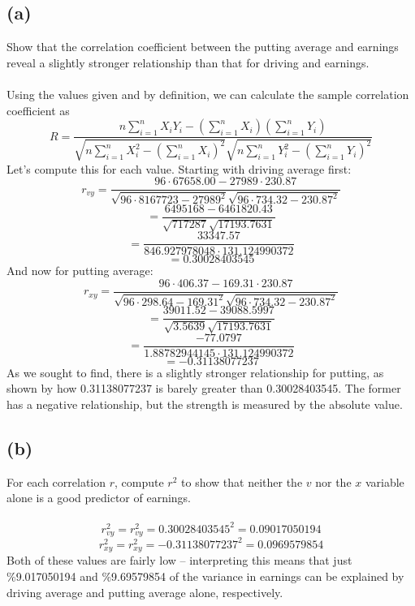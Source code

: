 \documentclass{article}
\begin{document}
{\subsection*{(a)} 
Show that the correlation coefficient between the
putting average and earnings reveal a slightly stronger relationship than that for driving and earnings.
\\
\\
Using the values given and by definition, we can calculate the sample correlation coefficient as 
\[
R = \frac{n \sum_{i=1}^{n} X_i Y_i - (\sum_{i=1}^{n} X_i)(\sum_{i=1}^{n}Y_i)}{\sqrt{n \sum_{i=1}^{n} X_i^2 - (\sum_{i=1}^{n} X_i)^2} \sqrt{n\sum_{i=1}^{n}Y_i^2 - (\sum_{i=1}^{n} Y_i)^2}}
\]
Let's compute this for each value. Starting with driving average first:
\[
r_{vy} = \frac{96 \cdot 67658.00 - 27989 \cdot 230.87}{\sqrt{96 \cdot 8167723 - 27989^2} \sqrt{96 \cdot 734.32 - 230.87^2}}
\]
\[
= \frac{6495168 - 6461820.43}{\sqrt{717287} \sqrt{17193.7631}}
\]
\[
= \frac{33347.57}{846.927978048 \cdot 131.124990372}
\]
\[
= 0.30028403545
\]
And now for putting average:
\[
r_{xy} = \frac{96 \cdot 406.37 - 169.31 \cdot 230.87}{\sqrt{96 \cdot 298.64 - 169.31^2} \sqrt{96 \cdot 734.32 - 230.87^2}}
\]
\[
= \frac{39011.52 - 39088.5997}{\sqrt{3.5639} \sqrt{17193.7631}}
\]
\[
= \frac{-77.0797}{1.88782944145 \cdot 131.124990372}
\]
\[
= -0.31138077237
\]
As we sought to find, there is a slightly stronger relationship for putting, as shown by how 0.31138077237 is barely greater than 0.30028403545. The former has a negative relationship, but the strength is measured by the absolute value.

\subsection*{(b)} 
For each correlation \(r\), compute \(r^2\) to show that neither the \(v\) nor the \(x\) variable alone is a good predictor of earnings.
\\
\\
\[
r^2_{vy} = r_{vy}^2 = 0.30028403545^2 = 0.09017050194
\]
\[
r^2_{xy} = r_{xy}^2 = -0.31138077237^2 = 0.0969579854
\]
Both of these values are fairly low -- interpreting this means that just \%9.017050194 and \%9.69579854 of the variance in earnings can be explained by driving average and putting average alone, respectively.

}
\end{document}
